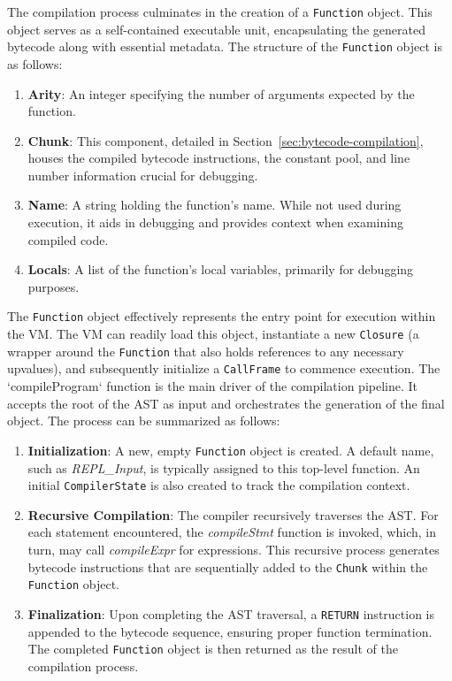 The compilation process culminates in the creation of a \texttt{Function} object.
This object serves as a self-contained executable unit, encapsulating the generated bytecode along with essential metadata.
The structure of the \texttt{Function} object is as follows:
\begin{enumerate}
    \item \textbf{Arity}: An integer specifying the number of arguments expected by the function.
    \item \textbf{Chunk}: This component, detailed in Section~\ref{sec:bytecode-compilation}, houses the compiled bytecode instructions, the constant pool, and line number information crucial for debugging.
    \item \textbf{Name}: A string holding the function's name.
    While not used during execution, it aids in debugging and provides context when examining compiled code.
    \item \textbf{Locals}: A list of the function's local variables, primarily for debugging purposes.
\end{enumerate}
The \texttt{Function} object effectively represents the entry point for execution within the VM. The VM can readily load this object, instantiate a new \texttt{Closure} (a wrapper around the \texttt{Function} that also holds references to any necessary upvalues), and subsequently initialize a \texttt{CallFrame} to commence execution.
The `compileProgram` function is the main driver of the compilation pipeline.
It accepts the root of the AST as input and orchestrates the generation of the final  object.
The process can be summarized as follows:
\begin{enumerate}
    \item \textbf{Initialization}: A new, empty \texttt{Function} object is created.
    A default name, such as \textit{REPL\_Input}, is typically assigned to this top-level function.
    An initial \texttt{CompilerState} is also created to track the compilation context.
    \item \textbf{Recursive Compilation}: The compiler recursively traverses the AST. For each statement 
    encountered, the \textit{compileStmt} function is invoked, which, in turn, may call \textit{compileExpr} for expressions. 
    This recursive process generates bytecode instructions that are sequentially added to the \texttt{Chunk} within the \texttt{Function} object.
    \item \textbf{Finalization}: Upon completing the AST traversal, a \texttt{RETURN} instruction is appended to the bytecode sequence, ensuring proper function termination.
    The completed \texttt{Function} object is then returned as the result of the compilation process.
\end{enumerate}
